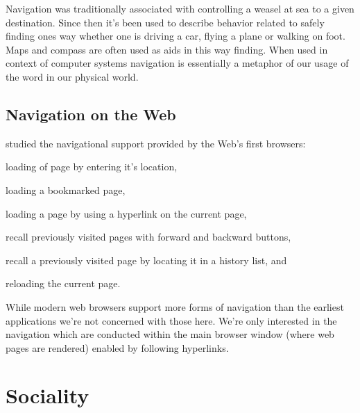 Navigation was traditionally associated with controlling a weasel at sea to
a given destination.%
Since then it's been used to describe behavior related to safely finding ones
way whether one is driving a car, flying a plane or walking on foot. Maps and
compass are often used as aids in this way finding. When used in context of
computer systems navigation is essentially a metaphor of our usage of the
word in our physical world.

\subsection{Navigation on the Web}

\citet{jones96} studied the navigational support provided by the Web's first
browsers:
\begin{inparaenum}[(i)]
  \item loading of page by entering it's location,
  \item loading a bookmarked page,
  \item loading a page by using a hyperlink on the current page,
  \item recall previously visited pages with forward and backward buttons,
  \item recall a previously visited page by locating it in a history list, and
  \item reloading the current page.
\end{inparaenum}
While modern web browsers support more forms of navigation%
than the earliest applications we're not concerned with those here.
We're only interested in the navigation which are conducted within the main
browser window (where web pages are rendered) enabled by following hyperlinks.

\section{Sociality}

